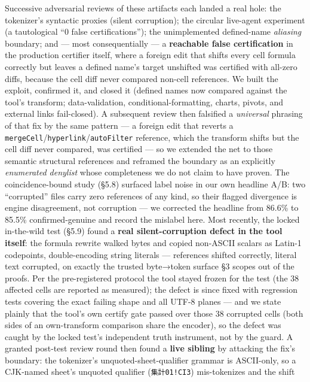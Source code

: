 \documentclass[
  11pt,
]{article}
\begin{document}
Successive adversarial reviews of these artifacts each landed a real
hole: the tokenizer's syntactic proxies (silent corruption); the
circular live-agent experiment (a tautological ``0 false
certifications''); the unimplemented defined-name \emph{aliasing}
boundary; and --- most consequentially --- a \textbf{reachable false
certification} in the production certifier itself, where a foreign edit
that shifts every cell formula correctly but leaves a defined name's
target unshifted was certified with all-zero diffs, because the cell
diff never compared non-cell references. We built the exploit, confirmed
it, and closed it (defined names now compared against the tool's
transform; data-validation, conditional-formatting, charts, pivots, and
external links fail-closed). A subsequent review then falsified a
\emph{universal} phrasing of that fix by the same pattern --- a foreign
edit that reverts a
\texttt{mergeCell}/\texttt{hyperlink}/\texttt{autoFilter} reference,
which the transform shifts but the cell diff never compared, was
certified --- so we extended the net to those semantic structural
references and reframed the boundary as an explicitly \emph{enumerated
denylist} whose completeness we do not claim to have proven. The
coincidence-bound study (§5.8) surfaced label noise in our own headline
A/B: two ``corrupted'' files carry zero references of any kind, so their
flagged divergence is engine disagreement, not corruption --- we
corrected the headline from 86.6\% to 85.5\% confirmed-genuine and
record the mislabel here. Most recently, the locked in-the-wild test
(§5.9) found a \textbf{real silent-corruption defect in the tool
itself}: the formula rewrite walked bytes and copied non-ASCII scalars
as Latin-1 codepoints, double-encoding string literals --- references
shifted correctly, literal text corrupted, on exactly the trusted
byte→token surface §3 scopes out of the proofs. Per the pre-registered
protocol the tool stayed frozen for the test (the 38 affected cells are
reported as measured); the defect is since fixed with regression tests
covering the exact failing shape and all UTF-8 planes --- and we state
plainly that the tool's own certify gate passed over those 38 corrupted
cells (both sides of an own-transform comparison share the encoder), so
the defect was caught by the locked test's independent truth instrument,
not by the guard. A granted post-test review round then found a
\textbf{live sibling} by attacking the fix's boundary: the tokenizer's
unquoted-sheet-qualifier grammar is ASCII-only, so a CJK-named sheet's
unquoted qualifier (\texttt{集計01!CI3}) mis-tokenizes and the shift
\end{document}
